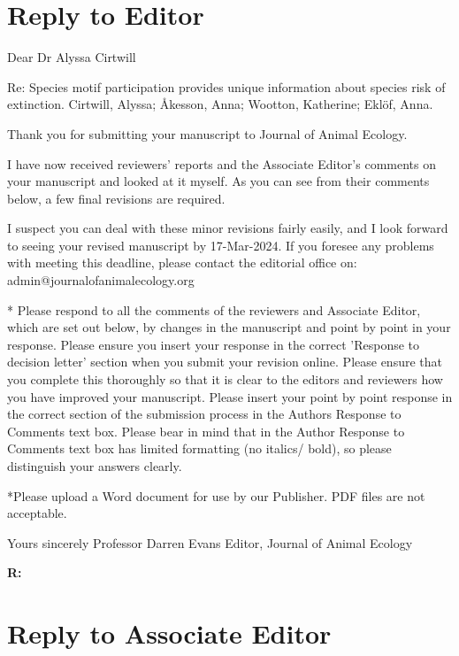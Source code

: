 \documentclass[12pt]{article}
\newenvironment{refquote}{\bigskip \begin{it}}{\end{it}\medskip}
\begin{document}

\section*{Reply to Editor}

    \begin{refquote}

    Dear Dr Alyssa Cirtwill

    Re: Species motif participation provides unique information about species risk of extinction.  Cirtwill, Alyssa; Åkesson, Anna; Wootton, Katherine; Eklöf, Anna.

    Thank you for submitting your manuscript to Journal of Animal Ecology.

    I have now received reviewers' reports and the Associate Editor's comments on your manuscript and looked at it myself. As you can see from their comments below, a few final revisions are required.

    I suspect you can deal with these minor revisions fairly easily, and I look forward to seeing your revised manuscript by 17-Mar-2024. If you foresee any problems with meeting this deadline, please contact the editorial office on: admin@journalofanimalecology.org

    * Please respond to all the comments of the reviewers and Associate Editor, which are set out below, by changes in the manuscript and point by point in your response.  Please ensure you insert your response in the correct 'Response to decision letter' section when you submit your revision online. Please ensure that you complete this thoroughly so that it is clear to the editors and reviewers how you have improved your manuscript. Please insert your point by point response in the correct section of the submission process in the Authors Response to Comments text box.  Please bear in mind that in the Author Response to Comments text box has limited formatting (no italics/ bold), so please distinguish your answers clearly.

    *Please upload a Word document for use by our Publisher. PDF files are not acceptable.


    Yours sincerely
    Professor Darren Evans
    Editor, Journal of Animal Ecology

    \end{refquote}

    \textbf{R:}

\clearpage


\section*{Reply to Associate Editor}
\end{document}
